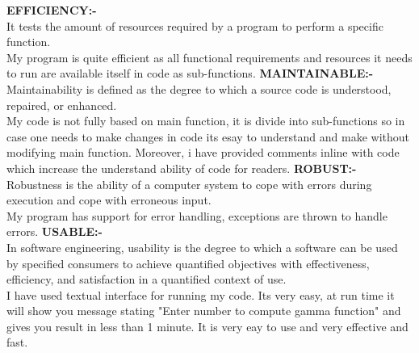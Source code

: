 \documentclass[10pt]{article}
\begin{document}
 \textbf{EFFICIENCY:-}\\
 It  tests the amount of resources required by a program to perform a specific function. \\
 My program is quite efficient as all functional requirements and resources it needs to run are available itself in code as sub-functions.
 \newline
 \textbf{MAINTAINABLE:-}\\
 Maintainability is defined as the degree to which a source code is understood, repaired, or enhanced. \\
 My code is not fully based on main function, it is divide into sub-functions so in case one needs to make changes in code its esay to understand and make without modifying main function. Moreover, i have provided comments inline with code which increase the understand ability of code for readers.
 \newline
\textbf{ ROBUST:-}\\
 Robustness is the ability of a computer system to cope with errors during execution and cope with erroneous input.\\
 My program has support for error handling, exceptions are thrown to handle errors.
 \newline
\textbf{ USABLE:-} \\
 In software engineering, usability is the degree to which a software can be used by specified consumers to achieve quantified objectives with effectiveness, efficiency, and satisfaction in a quantified context of use.\\
 I have used textual interface for running my code. Its very easy, at run time it will show you message stating "Enter  number to compute gamma function" and  gives you result in less than 1 minute. It is very eay to use and very effective and fast.
 

 \newpage
 
\end{document}
